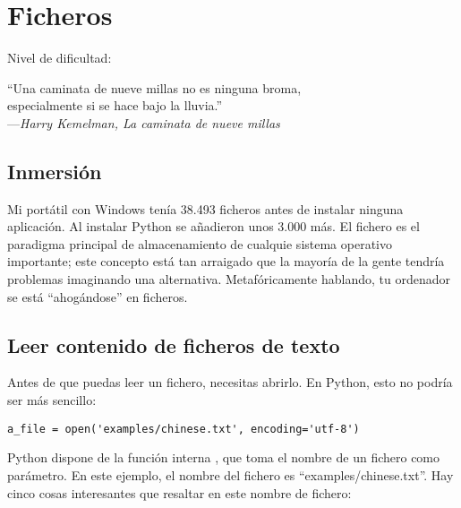 
\chapter{Ficheros}\label{ch:ficheros}

\noindent
Nivel de dificultad:\diflll

\begin{citaCap}
``Una caminata de nueve millas no es ninguna broma, \\
especialmente si se hace bajo la lluvia.'' \\
---\emph{Harry Kemelman, La caminata de nueve millas}
\end{citaCap}

\section{Inmersión}

Mi portátil con Windows tenía 38.493 ficheros antes de instalar ninguna aplicación. Al instalar Python se añadieron unos 3.000 más. El fichero es el paradigma principal de almacenamiento de cualquie sistema operativo importante; este concepto está tan arraigado que la mayoría de la gente tendría problemas imaginando una alternativa. Metafóricamente hablando, tu ordenador se está ``ahogándose'' en ficheros.

\section{Leer contenido de ficheros de texto}
\label{sec:leer_ficheros}

Antes de que puedas leer un fichero, necesitas abrirlo. En Python, esto no podría ser más sencillo:

\noindent\begin{minipage}{\textwidth}
\begin{lstlisting}[mathescape=True]
a_file = open('examples/chinese.txt', encoding='utf-8')
\end{lstlisting}
\end{minipage}

Python dispone de la función interna , que toma el nombre de un fichero como parámetro. En este ejemplo, el nombre del fichero es ``examples/chinese.txt''. Hay cinco cosas interesantes que resaltar en este nombre de fichero:

